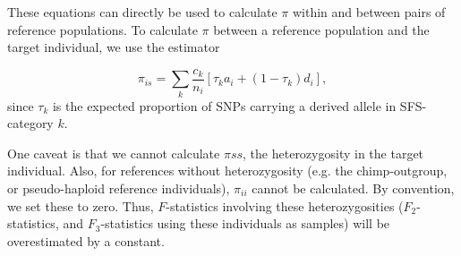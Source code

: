 \documentclass[10pt,a4paper]{article}
\begin{document}
These equations can directly be used to calculate $\pi$ within and between pairs of reference populations. To calculate $\pi$ between a reference population and the target individual, we use the estimator

\begin{equation}
\pi_{is} = \sum_k \frac{c_k}{n_i} \left[\tau_k a_i+ (1-\tau_k) d_i\right],
\end{equation}
since $\tau_k$ is the expected proportion of SNPs carrying a derived allele in SFS-category $k$.


One caveat is that we cannot calculate $\pi{ss}$, the heterozygosity in the target individual. Also, for references without heterozygosity (e.g. the chimp-outgroup, or pseudo-haploid reference individuals), $\pi_{ii}$ cannot be calculated. By convention, we set these to zero. Thus, $F$-statistics involving these heterozygosities ($F_2$-statistics, and $F_3$-statistics using these individuals as samples) will be overestimated by a constant.



\end{document}
